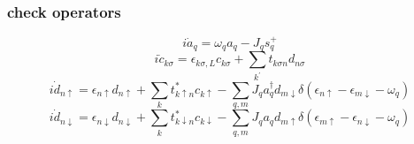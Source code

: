 \documentclass[11pt,a4paper]{article}
\begin{document}
\subsubsection{check operators}
\begin{equation}
i \dot{a}_{q}=\omega_{q} a_{q}-J_{q} s_{q}^{+}
\end{equation}
\begin{equation}
i \dot{c}_{k \sigma}=\epsilon_{k \sigma, L} c_{k \sigma}+\sum_{k^{\prime}} t_{k \sigma n} d_{n \sigma}
\end{equation}
\begin{equation}
i \dot{d}_{n \uparrow}=\epsilon_{n \uparrow} d_{n \uparrow}+\sum_{k} t_{k \uparrow n}^{*} c_{k \uparrow}-\sum_{q, m} J_{q} a_{q}^{\dagger}d_{m \downarrow}\delta(\epsilon_{n \uparrow}-\epsilon_{m \downarrow}-\omega_{q})
\end{equation}
\begin{equation}
i \dot{d}_{n \downarrow}=\epsilon_{n \downarrow} d_{n \downarrow}+\sum_{k} t_{k \downarrow n}^{*} c_{k \downarrow}-\sum_{q, m} J_{q} a_{q}d_{m \uparrow}\delta(\epsilon_{m \uparrow}-\epsilon_{n \downarrow}-\omega_{q})
\end{equation}
\end{document}
